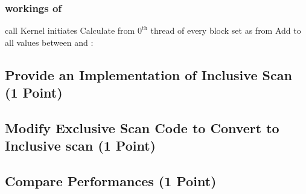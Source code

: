 \subsubsection*{workings of }

\begin{algorithm}
	\renewcommand{\thealgorithm}{}

	\caption{} 
	\begin{algorithmic}[1]
	\State call  
	\State Kernel initiates 
    \State Calculate  from  
	\State $0^{\mathrm{th}}$ thread of every block set  as  from 
	\State Add  to all values between  and :
	\State {}

	\end{algorithmic}
\end{algorithm}

\pagebreak
\subsection{Provide an Implementation of Inclusive Scan (1 Point)}


\pagebreak
\subsection{Modify Exclusive Scan Code to Convert to Inclusive scan (1 Point)}


\pagebreak
\subsection{Compare Performances (1 Point)}


\pagebreak